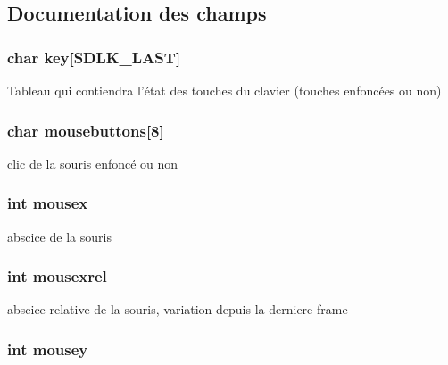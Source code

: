 \subsection{\-Documentation des champs}
\hypertarget{struct_input_afc4eabd057bd0061b56de4005f5ecbb8}{
\subsubsection[{key}]{\setlength{\rightskip}{0pt plus 5cm}char {\bf key}\mbox{[}\-S\-D\-L\-K\-\_\-\-L\-A\-S\-T\mbox{]}}}\label{struct_input_afc4eabd057bd0061b56de4005f5ecbb8}
\-Tableau qui contiendra l'état des touches du clavier (touches enfoncées ou non) \hypertarget{struct_input_adac23ff96bb7e429d24f8ff5fe61ed37}{
\subsubsection[{mousebuttons}]{\setlength{\rightskip}{0pt plus 5cm}char {\bf mousebuttons}\mbox{[}8\mbox{]}}}\label{struct_input_adac23ff96bb7e429d24f8ff5fe61ed37}
clic de la souris enfoncé ou non \hypertarget{struct_input_aa3d2105adcc19a5aba525c805fc49ff2}{
\subsubsection[{mousex}]{\setlength{\rightskip}{0pt plus 5cm}int {\bf mousex}}}\label{struct_input_aa3d2105adcc19a5aba525c805fc49ff2}
abscice de la souris \hypertarget{struct_input_aaa8f2a5a59acca7b0a299a049ae333d7}{
\subsubsection[{mousexrel}]{\setlength{\rightskip}{0pt plus 5cm}int {\bf mousexrel}}}\label{struct_input_aaa8f2a5a59acca7b0a299a049ae333d7}
abscice relative de la souris, variation depuis la derniere frame \hypertarget{struct_input_a6d4a0453f23b7c4df1a7be2972529a0b}{
\subsubsection[{mousey}]{\setlength{\rightskip}{0pt plus 5cm}int {\bf mousey}}}\label{struct_input_a6d4a0453f23b7c4df1a7be2972529a0b}
